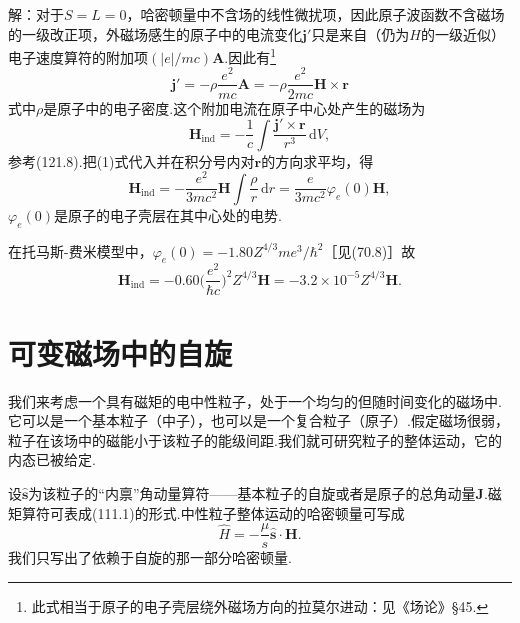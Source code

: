 \begin{xiti}
解：对于$S=L=0$，哈密顿量中不含场的线性微扰项，因此原子波函数不含磁场的一级改正项，外磁场感生的原子中的电流变化$\boldsymbol{j}'$只是来自（仍为$H$的一级近似）电子速度算符的附加项$(|e|/mc)\boldsymbol{A}$.因此有\footnote{此式相当于原子的电子壳层绕外磁场方向的拉莫尔进动：见《场论》§45.}
\setcounter{equation}{0}\renewcommand{\theequation}{\arabic{equation}}%
\begin{equation}
  \boldsymbol{j}'=-\rho\frac{e^2}{mc}\boldsymbol{A}
  =-\rho\frac{e^2}{2mc}\boldsymbol{H}\times\boldsymbol{r}
\end{equation}
式中$\rho$是原子中的电子密度.这个附加电流在原子中心处产生的磁场为
\begin{equation*}
  \boldsymbol{H}_{\mathrm{ind}}=-\frac{1}{c}\int
  \frac{\boldsymbol{j}'\times\boldsymbol{r}}{r^3}\,\mathrm{d}V,
\end{equation*}
参考(121.8).把(1)式代入并在积分号内对$\boldsymbol{r}$的方向求平均，得
\begin{equation}
  \boldsymbol{H}_{\mathrm{ind}}=-\frac{e^2}{3mc^2}\boldsymbol{H}\int\frac{\rho}{r}\,\mathrm{d}r
  =\frac{e}{3mc^2}\varphi_e(0)\boldsymbol{H},
\end{equation}
$\varphi_e(0)$是原子的电子壳层在其中心处的电势.

在托马斯-费米模型中，$\varphi_e(0)=-1.80Z^{4/3}me^3/\hbar^2$［见(70.8)］故
\begin{equation*}
  \boldsymbol{H}_{\mathrm{ind}}=-0.60\biggl(\frac{e^2}{\hbar c}\biggr)^2Z^{4/3}\boldsymbol{H}
  =-3.2\times10^{-5}Z^{4/3}\boldsymbol{H}.
\end{equation*}

\end{xiti}
\renewcommand{\theequation}{\arabic{section}.\arabic{equation}}%

\section{可变磁场中的自旋}

我们来考虑一个具有磁矩的电中性粒子，处于一个均匀的但随时间变化的磁场中.它可以是一个基本粒子（中子），也可以是一个复合粒子（原子）.假定磁场很弱，粒子在该场中的磁能小于该粒子的能级间距.我们就可研究粒子的整体运动，它的内态已被给定.

设$\hat{\boldsymbol{s}}$为该粒子的“内禀”角动量算符——基本粒子的自旋或者是原子的总角动量$\boldsymbol{J}$.磁矩算符可表成(111.1)的形式.中性粒子整体运动的哈密顿量可写成
\begin{equation}
  \hat{H}=-\frac{\mu}{s}\hat{\boldsymbol{s}}\cdot\boldsymbol{H}.
\end{equation}
我们只写出了依赖于自旋的那一部分哈密顿量.

